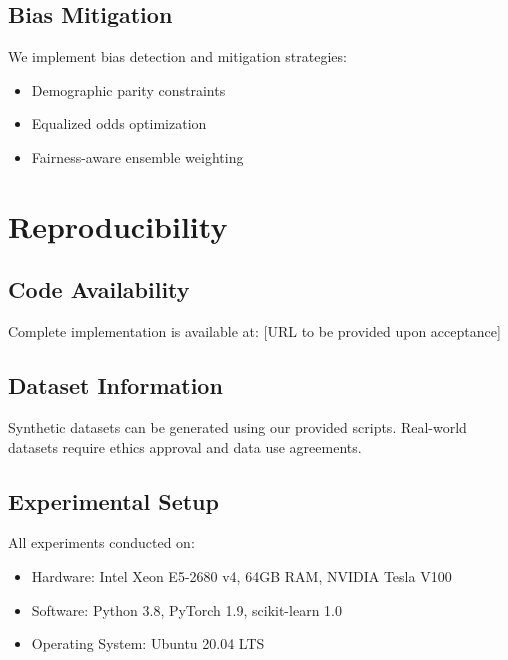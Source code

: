 \documentclass[conference]{IEEEtran}
\begin{document}
\subsection{Bias Mitigation}
We implement bias detection and mitigation strategies:
\begin{itemize}
\item Demographic parity constraints
\item Equalized odds optimization
\item Fairness-aware ensemble weighting
\end{itemize}

\section{Reproducibility}

\subsection{Code Availability}
Complete implementation is available at: [URL to be provided upon acceptance]

\subsection{Dataset Information}
Synthetic datasets can be generated using our provided scripts. Real-world datasets require ethics approval and data use agreements.

\subsection{Experimental Setup}
All experiments conducted on:
\begin{itemize}
\item Hardware: Intel Xeon E5-2680 v4, 64GB RAM, NVIDIA Tesla V100
\item Software: Python 3.8, PyTorch 1.9, scikit-learn 1.0
\item Operating System: Ubuntu 20.04 LTS
\end{itemize}
\end{document}
